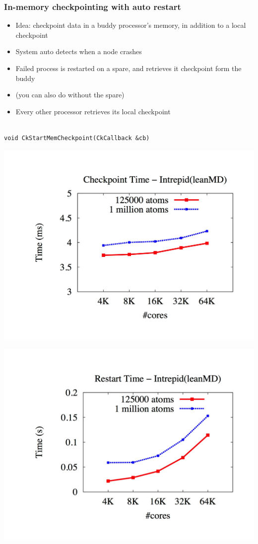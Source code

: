 \begin{frame}[fragile]
  \frametitle{In-memory checkpointing with auto restart}
\begin{itemize}

\item Idea: checkpoint data in a buddy processor's memory, in addition
  to a local checkpoint
\item System auto detects when a node crashes
\item  Failed process is restarted on a spare, and retrieves it
  checkpoint form the buddy
\item (you can also do without the spare)
\item Every other processor retrieves its local checkpoint 
\end{itemize}

 \begin{lstlisting}[basicstyle=\footnotesize]

void CkStartMemCheckpoint(CkCallback &cb)
\end{lstlisting}

\end{frame}

\begin{frame}[fragile]
  \includegraphics[width=\textwidth]{figures/checkpointTimeIntrepid.png}
\end{frame}

\begin{frame}[fragile]
  \includegraphics[width=\textwidth]{figures/restartTimeIntrepid.png}
\end{frame}

